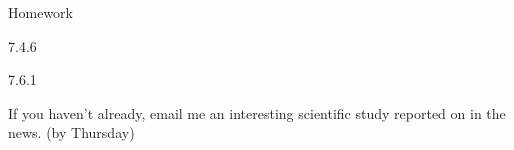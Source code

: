 \begin{frame}{Homework}

  \begin{center}

    7.4.6

  \vspace{2em}

    7.6.1

  \vspace{2em}

  If you haven't already, email me an interesting scientific study reported on in the news.  (by Thursday)

  \end{center}

\end{frame}









